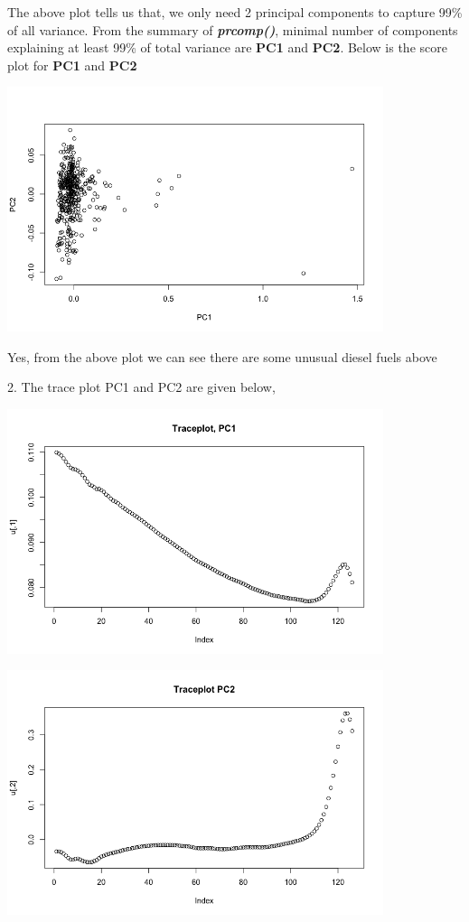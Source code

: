 \documentclass[a4paper,10pt]{article}
\begin{document}
The above plot tells us that, we only need 2 principal components to capture 99\% of all variance.
From the summary of \textbf{\textit{prcomp()}},
minimal number of components explaining at least 99\% of total variance are \textbf{PC1} and \textbf{PC2}. Below is the 
score plot for \textbf{PC1} and \textbf{PC2}
\begin{center}
  \includegraphics[width=110mm,scale=0.10]{PC1_PC2_Plot.png} 
\end{center}
Yes, from the above plot we can see there are some unusual diesel fuels above \par
2. The trace plot PC1 and PC2 are given below, \par
\begin{center}
    \includegraphics[width=110mm,scale=0.10]{Traceplot_PC1.png} \par
    \includegraphics[width=110mm,scale=0.10]{Traceplot_PC2.png}
\end{center} \par
\end{document}
